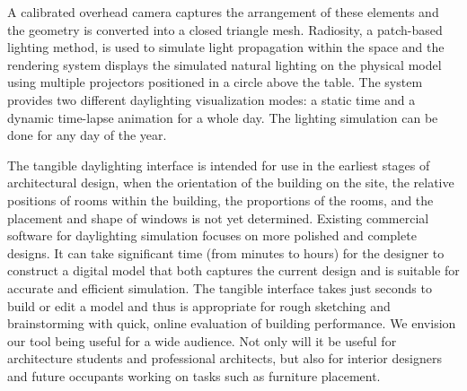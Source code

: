 %
A calibrated overhead camera captures the arrangement of these
elements and the geometry is converted into a closed triangle mesh.
Radiosity, a patch-based lighting method, is used to simulate light
propagation within the space and the rendering system displays the
simulated natural lighting on the physical model using multiple
projectors positioned in a circle above the table.  The system
provides two different daylighting visualization modes: a static time
and a dynamic time-lapse animation for a whole day.  The lighting
simulation can be done for any day of the year.

The tangible daylighting interface is intended for use in the earliest
stages of architectural design, when the orientation of the building
on the site, the relative positions of rooms within the building, the
proportions of the rooms, and the placement and shape of windows is
not yet determined.  Existing commercial software for daylighting
simulation focuses on more polished and complete designs.  It can take
significant time (from minutes to hours) for the designer to construct
a digital model that both captures the current design and is suitable
for accurate and efficient simulation.  The tangible interface takes
just seconds to build or edit a model and thus is appropriate for
rough sketching and brainstorming with quick, online evaluation of
building performance.  We envision our tool being useful for a wide
audience.  Not only will it be useful for architecture students and
professional architects, but also for interior designers and future
occupants working on tasks such as furniture placement.

